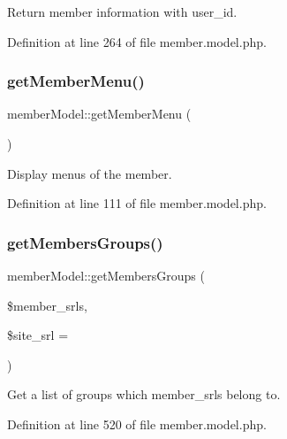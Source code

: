 Return member information with user\+\_\+id. 



Definition at line 264 of file member.\+model.\+php.

\mbox{\label{classmemberModel_acd26b1539d27466b84d16d2be10f82cd}} 
\subsubsection{\texorpdfstring{get\+Member\+Menu()}{getMemberMenu()}}
{\footnotesize\ttfamily member\+Model\+::get\+Member\+Menu (\begin{DoxyParamCaption}{ }\end{DoxyParamCaption})}



Display menus of the member. 



Definition at line 111 of file member.\+model.\+php.

\mbox{\label{classmemberModel_ab7df778ac5ecbd62a6901a9c9764ff4f}} 
\subsubsection{\texorpdfstring{get\+Members\+Groups()}{getMembersGroups()}}
{\footnotesize\ttfamily member\+Model\+::get\+Members\+Groups (\begin{DoxyParamCaption}\item[{}]{\$member\+\_\+srls,  }\item[{}]{\$site\+\_\+srl = {} }\end{DoxyParamCaption})}



Get a list of groups which member\+\_\+srls belong to. 



Definition at line 520 of file member.\+model.\+php.

\mbox{\label{classmemberModel_ab93bf81cb81a354594dcedea50559ce2}} 

